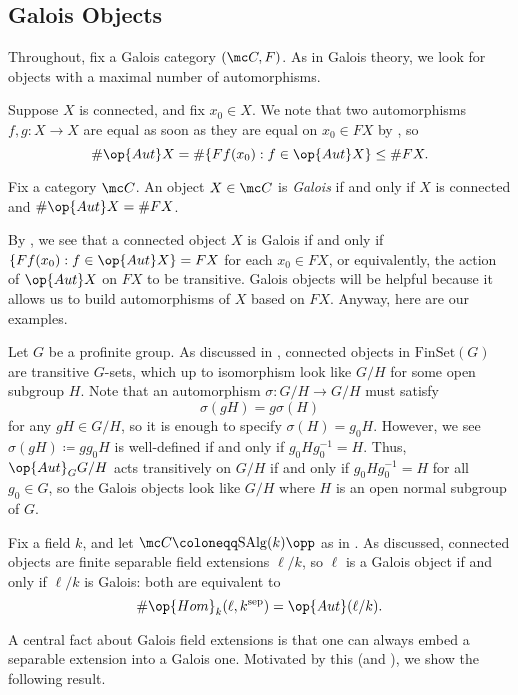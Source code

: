 \documentclass{amsart}
\begin{document}
\subsection{Galois Objects}
Throughout, fix a Galois category $(\mc C,F)$. As in Galois theory, we look for objects with a maximal number of automorphisms.
\begin{remark} \label{rem:motivate-galois}
    Suppose $X$ is connected, and fix $x_0\in X$. We note that two automorphisms $f,g\colon X\to X$ are equal as soon as they are equal on $x_0\in FX$ by , so
    \[\#\op{Aut}X=\#\{Ff(x_0):f\in\op{Aut}X\}\le\#FX.\]
\end{remark}
\begin{definition}[Galois]
    Fix a category $\mc C$. An object $X\in\mc C$ is \textit{Galois} if and only if $X$ is connected and $\#\op{Aut}X=\#FX$.
\end{definition}
By , we see that a connected object $X$ is Galois if and only if $\{Ff(x_0):f\in\op{Aut}X\}=FX$ for each $x_0\in FX$, or equivalently, the action of $\op{Aut}X$ on $FX$ to be transitive. Galois objects will be helpful because it allows us to build automorphisms of $X$ based on $FX$. Anyway, here are our examples.
\begin{example} \label{ex:g-set-galois}
    Let $G$ be a profinite group. As discussed in , connected objects in $\mathrm{FinSet}(G)$ are transitive $G$-sets, which up to isomorphism look like $G/H$ for some open subgroup $H$. Note that an automorphism $\sigma\colon G/H\to G/H$ must satisfy
    \[\sigma(gH)=g\sigma(H)\]
    for any $gH\in G/H$, so it is enough to specify $\sigma(H)=g_0H$. However, we see $\sigma(gH)\coloneqq gg_0H$ is well-defined if and only if $g_0Hg_0^{-1}=H$. Thus, $\op{Aut}_GG/H$ acts transitively on $G/H$ if and only if $g_0Hg_0^{-1}=H$ for all $g_0\in G$, so the Galois objects look like $G/H$ where $H$ is an open normal subgroup of $G$.
\end{example}
\begin{example} \label{ex:galois-field}
    Fix a field $k$, and let $\mc C\coloneqq\mathrm{SAlg}(k)\opp$ as in . As discussed, connected objects are finite separable field extensions $\ell/k$, so $\ell$ is a Galois object if and only if $\ell/k$ is Galois: both are equivalent to
    \[\#\op{Hom}_k(\ell,k^{\mathrm{sep}})=\op{Aut}(\ell/k).\]
\end{example}
A central fact about Galois field extensions is that one can always embed a separable extension into a Galois one. Motivated by this (and ), we show the following result.
\end{document}
